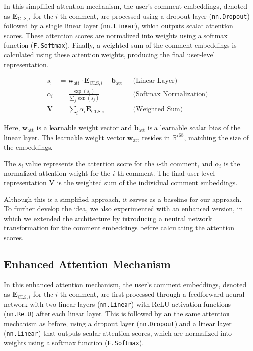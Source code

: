 \documentclass[twoside]{ctuthesis}
\theoremstyle{plain}
\theoremstyle{definition}
\theoremstyle{note}
\begin{document}
In this simplified attention mechanism, the user's comment embeddings, denoted as \( \mathbf{E}_{\mathrm{CLS}, i} \) for the \( i \)-th comment, are processed using a dropout layer (\texttt{nn.Dropout}) followed by a single linear layer (\texttt{nn.Linear}), which outputs scalar attention scores. These attention scores are normalized into weights using a softmax function (\texttt{F.Softmax}). Finally, a weighted sum of the comment embeddings is calculated using these attention weights, producing the final user-level representation. \par

\begin{align}
    s_i &= \mathbf{w}_{\mathrm{att}} \cdot \mathbf{E}_{\mathrm{CLS}, i} + \mathbf{b}_{\mathrm{att}} && \text{(Linear Layer)} \\
    \alpha_i &= \frac{\exp(s_i)}{\sum_{j} \exp(s_j)} && \text{(Softmax Normalization)} \\
    \mathbf{V} &= \sum_i \alpha_i \mathbf{E}_{\mathrm{CLS}, i} && \text{(Weighted Sum)}
\end{align}

Here, \( \mathbf{w}_{\mathrm{att}} \) is a learnable weight vector and  \( \mathbf{b}_{\mathrm{att}} \) is a learnable scalar bias of the linear layer. The learnable weight vector \( \mathbf{w}_{\mathrm{att}} \) resides in \( \mathbb{R}^{768} \), matching the size of the embeddings.

The \( s_i \) value represents the attention score for the \( i \)-th comment, and \( \alpha_i \) is the normalized attention weight for the \( i \)-th comment. The final user-level representation \( \mathbf{V} \) is the weighted sum of the individual comment embeddings.\par

Although this is a simplified approach, it serves as a baseline for our approach. To further develop the idea, we also experimented with an enhanced version, in which we extended the architecture by introducing a neutral network transformation for the comment embeddings before calculating the attention scores.

\subsection{Enhanced Attention Mechanism}
\label{sec:enhanced_attention}
In this enhanced attention mechanism, the user's comment embeddings, denoted as \( \mathbf{E}_{\mathrm{CLS}, i} \) for the \( i \)-th comment, are first processed through a feedforward neural network with two linear layers (\texttt{nn.Linear}) with ReLU activation functions (\texttt{nn.ReLU}) after each linear layer. This is followed by an the same attention mechanism as before, using a dropout layer (\texttt{nn.Dropout}) and a linear layer (\texttt{nn.Linear}) that outputs scalar attention scores, which are normalized into weights using a softmax function (\texttt{F.Softmax}).\par
\end{document}
